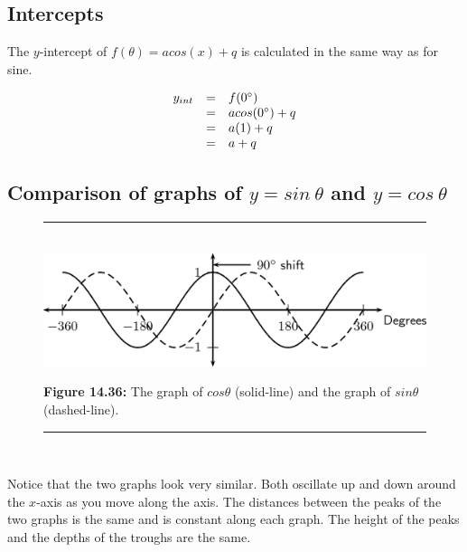 \subsection*{Intercepts}
\nopagebreak
The $y$-intercept of $f(\theta )=acos(x)+q$ is calculated in the same way as for sine.\par 
\nopagebreak\noindent{}
\begin{equation*}
\begin{array}{ccc}\hfill {y}_{int}& =& f({0}^{\circ })\hfill \\ & =& acos({0}^{\circ })+q\hfill \\ & =& a(1)+q\hfill \\ & =& a+q\hfill \end{array}
\end{equation*}

\subsection*{Comparison of graphs of $y=sin~\theta $ and $y=cos~\theta $}
\nopagebreak
\setcounter{subfigure}{0}
\begin{figure}[H] %
\begin{center}
\rule[.1in]{\figurerulewidth}{.005in} \\
\label{m39414*uid69!!!underscore!!!media}\label{m39414*uid69!!!underscore!!!printimage}\includegraphics{col11306.imgs/m39414_MG10C15_030.png} %
\vspace{2pt}
\vspace{\rubberspace}\par \begin{cnxcaption}
\small \textbf{Figure 14.36: }The graph of $cos\theta $ (solid-line) and the graph of $sin\theta $ (dashed-line).
\end{cnxcaption}
\vspace{.1in}
\rule[.1in]{\figurerulewidth}{.005in} \\
\end{center}
\end{figure}       
Notice that the two graphs look very similar. Both oscillate up and down around the $x$-axis as you move along the axis. The distances between the peaks of the two graphs is the same and is constant along each graph. The height of the peaks and the depths of the troughs are the same.\par 
